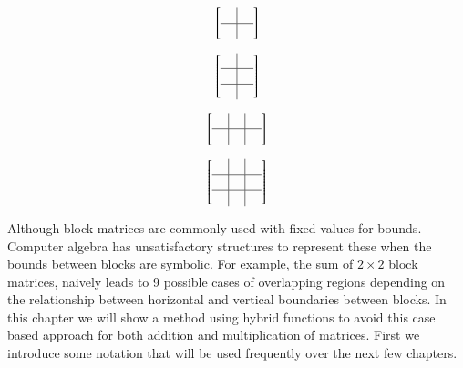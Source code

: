 \begin{figure}[ht]
	\caption[Possible block overlaps of $2 \times 2$ block matrices.]{There are 9 possible permutations. 1x (a) 2x (b) 2x (c) 4x (d)}
	\label{MatAdditionPermutations}
	\begin{subfigure}[b]{0.24\textwidth}
		\caption{}
		\begin{equation*}
			\left[ \begin{array}{c|c}
				\; & \; \\
				\hline
				& \\
			\end{array}\right]
		\end{equation*}
	\end{subfigure}
	\begin{subfigure}[b]{0.24\textwidth}
		\caption{}
		\begin{equation*}
			\left[ \begin{array}{c|c}
				\; & \; \\
				\hline
				& \\
				\hline
				& \\
			\end{array}\right]
		\end{equation*}
	\end{subfigure}
	\begin{subfigure}[b]{0.24\textwidth}
		\caption{}
		\begin{equation*}
			\left[ \begin{array}{c|c|c}
				\; & \; & \;  \\
				\hline
				& \\
			\end{array}\right]
		\end{equation*}
	\end{subfigure}
	\begin{subfigure}[b]{0.24\textwidth}
		\caption{}
		\begin{equation*}
			\left[ \begin{array}{c|c|c}
				\; & \; & \; \\
				\hline
				& \\
				\hline
				& \\
			\end{array}\right]
		\end{equation*}
	\end{subfigure}
\end{figure}

Although block matrices are commonly used with fixed values for bounds.
Computer algebra has unsatisfactory structures to represent these when the bounds between blocks are symbolic.
For example, the sum of $2 \times 2$ block matrices, naively leads to 9 possible cases of overlapping regions depending on
the relationship between horizontal and vertical boundaries between blocks.
In this chapter we will show a method using hybrid functions to avoid this case based approach for both addition
and multiplication of matrices.
First we introduce some notation that will be used frequently over the next few chapters.

